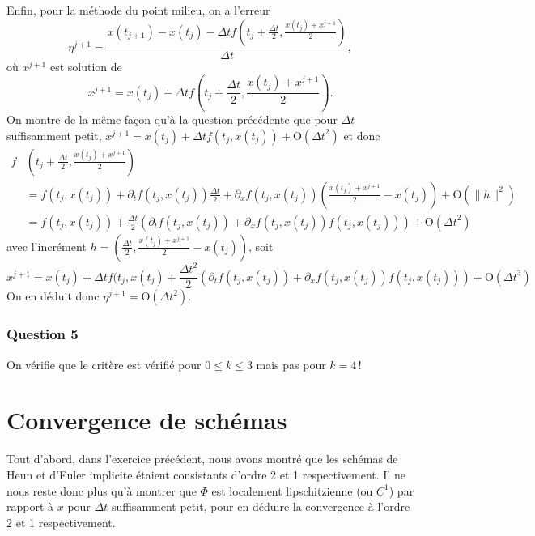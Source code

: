 Enfin, pour la méthode du point milieu, on a l'erreur \[
\eta^{j+1} = \frac{x(t_{j+1}) - x(t_j) - {\Delta t}f\left(t_j+\frac{{\Delta t}}{2},\frac{x(t_j)+x^{j+1}}{2}\right)}{{\Delta t}},
\] où \(x^{j+1}\) est solution de \[
x^{j+1} = x(t_j) + {\Delta t}f\left(t_j+\frac{{\Delta t}}{2},\frac{x(t_j)+x^{j+1}}{2}\right) .
\] On montre de la même façon qu'à la question précédente que pour
\({\Delta t}\) suffisamment petit,
\(x^{j+1} = x(t_j)+{\Delta t}f(t_j, x(t_j)) + \mathrm{O}({\Delta t}^2)\)
et donc \begin{align*}
f&\left(t_j+\frac{{\Delta t}}{2},\frac{x(t_j)+x^{j+1}}{2}\right)\\ &= f(t_j,x(t_j)) + \partial_t f(t_j,x(t_j)) \frac{{\Delta t}}{2} +  \partial_x f(t_j,x(t_j))\left(\frac{x(t_j)+x^{j+1}}{2} - x(t_j)\right) + \mathrm{O}(\|h\|^2) \\
&= f(t_j, x(t_j)) + \frac{{\Delta t}}{2} (\partial_t f(t_j,x(t_j)) + \partial_x f(t_j,x(t_j))f(t_j,x(t_j))) + \mathrm{O}({\Delta t}^2)
\end{align*} avec l'incrément
\(h=\left(\frac{{\Delta t}}{2}, \frac{x(t_j)+x^{j+1}}{2} - x(t_j)\right)\),
soit \[
x^{j+1} = x(t_j) + {\Delta t}f(t_j,x(t_j) + \frac{{\Delta t}^2}{2} (\partial_t f(t_j,x(t_j)) + \partial_x f(t_j,x(t_j))f(t_j,x(t_j))) + \mathrm{O}({\Delta t}^3)
\] On en déduit donc \(\eta^{j+1}=\mathrm{O}({\Delta t}^2)\).

\hypertarget{ed2-answer-consist-5}{%
\subsubsection*{Question 5}\label{ed2-answer-consist-5}}


On vérifie que le critère est vérifié pour \(0\leq k \leq 3\) mais pas
pour \(k=4\)\,!

\hypertarget{ed2-answer-conv}{%
\section{Convergence de schémas}\label{ed2-answer-conv}}

Tout d'abord, dans l'exercice précédent, nous avons montré que les
schémas de Heun et d'Euler implicite étaient consistants d'ordre 2 et 1
respectivement. Il ne nous reste donc plus qu'à montrer que \(\Phi\) est
localement lipschitzienne (ou \(C^1\)) par rapport à \(x\) pour
\({\Delta t}\) suffisamment petit, pour en déduire la convergence à
l'ordre 2 et 1 respectivement.

